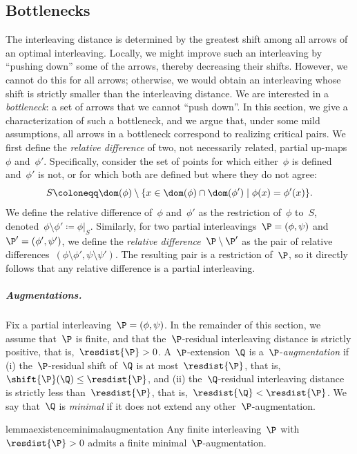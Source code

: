 \subsection{Bottlenecks}\label{sec:bottlenecks}
The interleaving distance is determined by the greatest shift among all arrows of an optimal interleaving.
Locally, we might improve such an interleaving by ``pushing down'' some of the arrows, thereby decreasing their shifts. 
However, we cannot do this for all arrows; otherwise, we would obtain an interleaving whose shift is strictly smaller than the interleaving distance.
We are interested in a \emph{bottleneck}: a set of arrows that we cannot ``push down''.
In this section, we give a characterization of such a bottleneck, and we argue that, under some mild assumptions, all arrows in a bottleneck correspond to realizing critical pairs.
%
We first define the \emph{relative difference} of two, not necessarily related, partial up-maps~$\phi$ and~$\phi'$.
Specifically, consider the set of points for which either~$\phi$ is defined and~$\phi'$ is not, or for which both are defined but where they do not agree:
\[
S \coloneqq \dom(\phi) \setminus \{x \in \dom(\phi) \cap \dom(\phi') \mid \phi(x) = \phi'(x)\}. 
\]
We define the relative difference of~$\phi$ and~$\phi'$ as the restriction of~$\phi$ to~$S$, denoted~${\phi \setminus \phi' \coloneqq \phi \vert_{S}}$.
Similarly, for two partial interleavings~$\P = (\phi, \psi)$ and~$\P' = (\phi', \psi')$, we define the \emph{relative difference}~$\P \setminus \P'$ as the pair of relative differences~$(\phi \setminus \phi', \psi \setminus \psi')$.
The resulting pair is a restriction of~$\P$, so it directly follows that any relative difference is a partial interleaving.
%
\subparagraph{Augmentations.}
Fix a partial interleaving~$\P = (\phi, \psi)$.
In the remainder of this section, we assume that~$\P$ is finite, and that the~$\P$-residual interleaving distance is strictly positive, that is,~$\resdist{\P}> 0$.
A~$\P$-extension~$\Q$ is a~$\P$-\emph{augmentation} if (i) the~$\P$-residual shift of~$\Q$ is at most~$\resdist{\P}$, that is,~$\shift{\P}(\Q) \le \resdist{\P} $, and (ii) the~$\Q$-residual interleaving distance is strictly less than~$\resdist{\P}$, that is,~$\resdist{\Q} < \resdist{\P}$.
We say that~$\Q$ is \emph{minimal} if it does not extend any other~$\P$-augmentation.
%
\begin{restatable}{lemma}{existenceminimalaugmentation}
\label{lem:existence-minimal-augmentation}
    Any finite interleaving~$\P$ with~$\resdist{\P} > 0$ admits a finite minimal~$\P$-augmentation.
\end{restatable}
